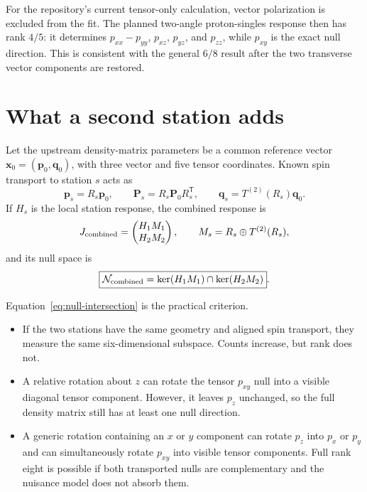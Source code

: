 \documentclass[11pt,a4paper]{article}
\newcommand{\vect}[1]{\bm{#1}}
\newcommand{\Tens}{\bm P}
\newcommand{\Null}{\mathcal N}
\begin{document}
For the repository's current tensor-only calculation, vector polarization is
excluded from the fit.  The planned two-angle proton-singles response then has
rank $4/5$: it determines $p_{xx}-p_{yy}$, $p_{xz}$, $p_{yz}$, and $p_{zz}$,
while $p_{xy}$ is the exact null direction.  This is consistent with the general
$6/8$ result after the two transverse vector components are restored.

\section{What a second station adds}

Let the upstream density-matrix parameters be a common reference vector
$\vect x_0=(\vect p_0,\vect q_0)$, with three vector and five tensor coordinates.
Known spin transport to station $s$ acts as
\begin{equation}
 \vect p_s=R_s\vect p_0,\qquad
 \Tens_s=R_s\Tens_0R_s^{\mathsf T},\qquad
 \vect q_s=T^{(2)}(R_s)\vect q_0.
\end{equation}
If $H_s$ is the local station response, the combined response is
\begin{equation}
 J_{\rm combined}=
 \begin{pmatrix}
 H_1M_1\\ H_2M_2
 \end{pmatrix},\qquad
 M_s=R_s\oplus T^{(2)}(R_s),
\end{equation}
and its null space is
\begin{equation}
 \boxed{\Null_{\rm combined}
 =\ker(H_1M_1)\cap\ker(H_2M_2)}.
 \label{eq:null-intersection}
\end{equation}

Equation~\eqref{eq:null-intersection} is the practical criterion.
\begin{itemize}
 \item If the two stations have the same geometry and aligned spin transport,
 they measure the same six-dimensional subspace.  Counts increase, but rank does
 not.
 \item A relative rotation about $z$ can rotate the tensor $p_{xy}$ null into a
 visible diagonal tensor component.  However, it leaves $p_z$ unchanged, so the
 full density matrix still has at least one null direction.
 \item A generic rotation containing an $x$ or $y$ component can rotate $p_z$
 into $p_x$ or $p_y$ and can simultaneously rotate $p_{xy}$ into visible tensor
 components.  Full rank eight is possible if both transported nulls are
 complementary and the nuisance model does not absorb them.
\end{itemize}
\end{document}
